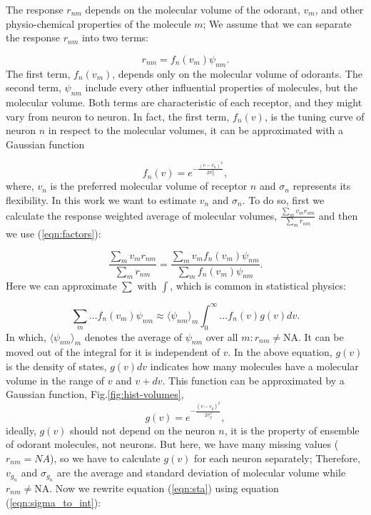 \documentclass[landscape,a1paper,fontscale=0.6]{baposter} %
\begin{document}
\begin{poster}
{The response $r_{nm}$ depends on the molecular volume of the odorant, $v_m$, 
and other physio-chemical properties of the molecule $m$; 
We assume that we can separate the response $r_{nm}$ into two terms:

\begin{equation}
	r_{nm} = f_n(v_m) \psi_{nm}.
	\label{eqn:factors}
\end{equation}
The first term, $f_n(v_m)$, depends only on the molecular volume of odorants.
The second term, $\psi_{nm}$ include every other influential properties of molecules, but the molecular volume.
Both terms are characteristic of each receptor, and they might vary from neuron to neuron.
In fact, the first term, $f_n(v)$, is the tuning curve of neuron $n$ in respect to the molecular volumes, 
it can be approximated with a Gaussian function

\begin{equation}
	\displaystyle f_n(v) = e^{-\frac{(v-v_n)^2}{2\sigma^2_n}}, 
	\label{eqn:volume-dependence}
\end{equation}
where, $v_n$ is the preferred molecular volume of receptor $n$ and $\sigma_n$ represents its flexibility. 
In this work we want to estimate $v_n$ and $\sigma_n$. 
To do so, first we calculate the response weighted average of molecular volumes, 
$\frac{\sum_{m} v_m r_{nm}}{\sum_{m} r_{nm}}$ and then we use (\ref{eqn:factors}):

\begin{equation}
	\frac{\displaystyle \sum_{m} v_m r_{nm}}{\displaystyle \sum_{m} r_{nm}} = \frac{\displaystyle \sum_{m} v_m f_n(v_m) \psi_{nm}}{\displaystyle \sum_{m} f_n(v_m) \psi_{nm}}.
	\label{eqn:sta}
\end{equation}
Here we can approximate $\sum$ with $\int$, which is common in statistical physics:

\begin{equation}
	\sum_{m} \dots f_n(v_m) \psi_{nm} \approx  \langle \psi_{nm} \rangle_m \int_0^\infty \dots f_n(v) g(v)  dv. 
	\label{eqn:sigma_to_int}
\end{equation}
In which, 
$\langle \psi_{nm} \rangle_m$ denotes the average of $\psi_{nm}$ over all $m: r_{nm} \neq \text{NA}$. 
It can be moved out of the integral for it is independent of $v$.
In the above equation, 
$g(v)$ is the density of states, $g(v) dv$ indicates how many molecules have a molecular volume in the range of $v$ and $v+dv$.
This function can be approximated by a Gaussian function, Fig.\ref{fig:hist-volumes}, 
\begin{equation}
	g(v) = e^{-\frac{(v- v_{g})^2}{2 \sigma_{g}^2}},
	\label{eqn:hist-volumes}
\end{equation}
ideally, $g(v)$ should not depend on the neuron $n$, 
it is the property of ensemble of odorant molecules, not neurons. 
But here, we have many missing values ($r_{nm} = NA$), 
so we have to calculate $g(v)$ for each neuron separately; 
Therefore, $v_{g_n}$ and $\sigma_{g_n}$ are the average and standard deviation of molecular volume while $r_{nm} \neq \text{NA}$.
Now we rewrite equation (\ref{eqn:sta}) using equation (\ref{eqn:sigma_to_int}):

}
\end{poster}
\end{document}
